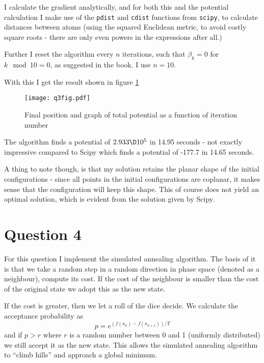 \documentclass[a4paper,10pt]{article}
\begin{document}
	I calculate the gradient analytically, and for both this and the potential calculation I make use of the \texttt{pdist} and \texttt{cdist} functions from \texttt{scipy}, to calculate distances between atoms (using the squared Euclidean metric, to avoid costly square roots - there are only even powers in the expressions after all.)
	
	Further I reset the algorithm every $ n $ iterations, such that $ \beta_k = 0 $ for $ k \mod 10  = 0  $, as suggested in the book. I use $ n=10 $.
	
	With this I get the result shown in figure \ref{fig:q3fig}
	
	\begin{figure}[H]
		\centering
		\texttt{[image: q3fig.pdf]}
		\caption{Final position and graph of total potential as a function of iteration number}
		\label{fig:q3fig}
	\end{figure}

	The algorithm finds a potential of $ 2.933\D10^{5} $ in 14.95 seconds - not exactly impressive compared to Scipy which finds a potential of -177.7 in 14.65 seconds.
	
	A thing to note though, is that my solution retains the planar shape of the initial configurations - since all points in the initial configurations are coplanar, it makes sense that the configuration will keep this shape. This of course does not yield an optimal solution, which is evident from the solution given by Scipy.
	
	\section*{Question 4}
	For this question I implement the simulated annealing algorithm. The basis of it is that we take a random step in a random direction in phase space (denoted as a neighbour), compute its cost. If the cost of the neighbour is smaller than the cost of the original state we adopt this as the new state.
	
	If the cost is greater, then we let a roll of the dice decide. We calculate the acceptance probability as
	\begin{equation}\label{key}
		p = e^{(f(x_k) - f(x_{k+1}))/T}
	\end{equation}
	and if $ p>r $ where $ r $ is a random number between 0 and 1 (uniformly distributed) we still accept it as the new state. This allows the simulated annealing algorithm to ``climb hills'' and approach a global minimum.
	
\end{document}

